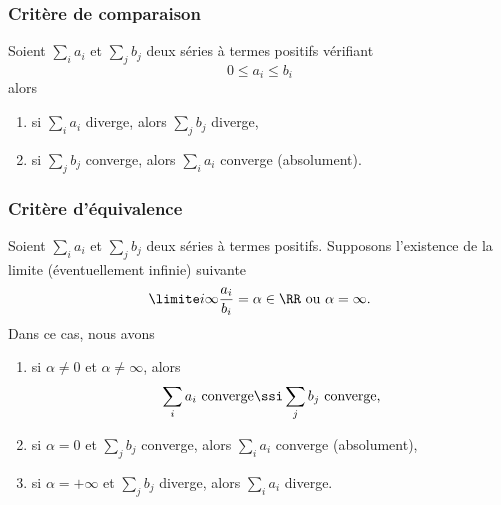 \subsubsection{Critère de comparaison} 

\begin{lemma}   \label{LemgHWyfG}
Soient $\sum_i a_i$ et $\sum_j
b_j$ deux séries à termes positifs vérifiant
\begin{equation*}
  0 \leq a_i \leq b_i
\end{equation*}
alors
\begin{enumerate}
\item si $\sum_i a_i$ diverge, alors $\sum_j b_j$ diverge,
\item si $\sum_j b_j$ converge, alors $\sum_i a_i$ converge
  (absolument).
  \end{enumerate}
\end{lemma}

\subsubsection{Critère d'équivalence}

\begin{proposition}
 Soient $\sum_i a_i$ et $\sum_j b_j$ deux séries à termes positifs. Supposons l'existence de la limite (éventuellement infinie) suivante
\begin{equation}
  \limite i \infty \frac{a_i}{b_i} = \alpha \in \RR \text{ ou $\alpha =
    \infty$.}
\end{equation}
Dans ce cas, nous avons
\begin{enumerate}
\item si $\alpha \neq 0$ et $\alpha\neq \infty$, alors
  \begin{equation}
    \sum_i a_i \text{~converge} \ssi \sum_j b_j\text{~converge,}
  \end{equation}
\item si $\alpha = 0$ et $\sum_j b_j$ converge, alors $\sum_i a_i$
  converge (absolument),
\item si $\alpha = +\infty$ et $\sum_j b_j$ diverge, alors $\sum_i
  a_i$ diverge.
\end{enumerate}
\end{proposition}

